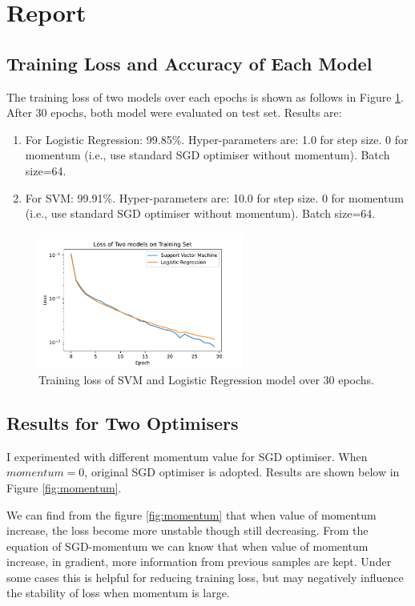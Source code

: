 \documentclass[12pt,letterpaper]{report}
\begin{document}
{}

\section*{Report}
\subsection*{Training Loss and Accuracy of Each Model}
The training loss of two models over each epochs is shown as follows in Figure \ref{fig:acc_and_loss}.
After 30 epochs, both model were evaluated on test set. Results are:
\begin{enumerate}
	\item For Logistic Regression: 99.85\%. Hyper-parameters are: 1.0 for step size. 0 for momentum (i.e., use standard SGD optimiser without momentum). Batch size=64.
	\item For SVM: 99.91\%. Hyper-parameters are: 10.0 for step size. 0 for momentum (i.e., use standard SGD optimiser without momentum). Batch size=64.
\end{enumerate}

\begin{figure}[h]
	\centering
	\includegraphics[width=0.6\textwidth]{Accuracy_with_epoch}
	\caption{Training loss of SVM and Logistic Regression model over 30 epochs.}
	\label{fig:acc_and_loss}
\end{figure}

\subsection*{Results for Two Optimisers}
I experimented with different momentum value for SGD optimiser. When $momentum = 0$, original SGD optimiser is adopted. Results are shown below in Figure \ref{fig:momentum}.

We can find from the figure \ref{fig:momentum} that when value of momentum increase, the loss become more unstable though still decreasing. From the equation of SGD-momentum we can know that when value of momentum increase, in gradient, more information from previous samples are kept. Under some cases this is helpful for reducing training loss, but may negatively influence the stability of loss when momentum is large. 
\end{document}
